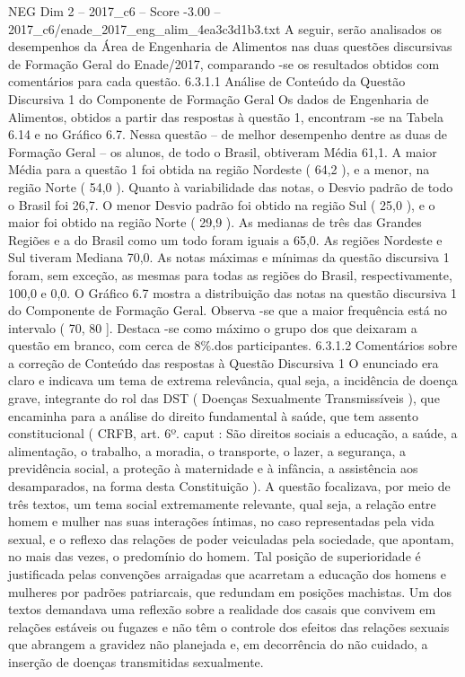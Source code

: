 \begin{textsample}{NEG Dim 2 – 2017\_c6 – Score -3.00 – 2017\_c6/enade\_2017\_eng\_alim\_4ea3c3d1b3.txt}
A seguir, serão analisados os desempenhos da Área de Engenharia de Alimentos nas duas questões discursivas de Formação Geral do Enade/2017, comparando -se os resultados obtidos com comentários para cada questão. 6.3.1.1 Análise de Conteúdo da Questão Discursiva 1 do Componente de Formação Geral Os dados de Engenharia de Alimentos, obtidos a partir das respostas à questão 1, encontram -se na Tabela 6.14 e no Gráfico 6.7.
Nessa questão – de melhor desempenho dentre as duas de Formação Geral – os alunos, de todo o Brasil, obtiveram Média 61,1.
A maior Média para a questão 1 foi obtida na região Nordeste ( 64,2 ), e a menor, na região Norte ( 54,0 ).
Quanto à variabilidade das notas, o Desvio padrão de todo o Brasil foi 26,7.
O menor Desvio padrão foi obtido na região Sul ( 25,0 ), e o maior foi obtido na região Norte ( 29,9 ).
As medianas de três das Grandes Regiões e a do Brasil como um todo foram iguais a 65,0.
As regiões Nordeste e Sul tiveram Mediana 70,0.
As notas máximas e mínimas da questão discursiva 1 foram, sem exceção, as mesmas para todas as regiões do Brasil, respectivamente, 100,0 e 0,0.
O Gráfico 6.7 mostra a distribuição das notas na questão discursiva 1 do Componente de Formação Geral.
Observa -se que a maior frequência está no intervalo ( 70, 80 ].
Destaca -se como máximo o grupo dos que deixaram a questão em branco, com cerca de 8\%.dos participantes. 6.3.1.2 Comentários sobre a correção de Conteúdo das respostas à Questão Discursiva 1 O enunciado era claro e indicava um tema de extrema relevância, qual seja, a incidência de doença grave, integrante do rol das DST ( Doenças Sexualmente Transmissíveis ), que encaminha para a análise do direito fundamental à saúde, que tem assento constitucional ( CRFB, art. 6º. caput : São direitos sociais a educação, a saúde, a alimentação, o trabalho, a moradia, o transporte, o lazer, a segurança, a previdência social, a proteção à maternidade e à infância, a assistência aos desamparados, na forma desta Constituição ).
A questão focalizava, por meio de três textos, um tema social extremamente relevante, qual seja, a relação entre homem e mulher nas suas interações íntimas, no caso representadas pela vida sexual, e o reflexo das relações de poder veiculadas pela sociedade, que apontam, no mais das vezes, o predomínio do homem.
Tal posição de superioridade é justificada pelas convenções arraigadas que acarretam a educação dos homens e mulheres por padrões patriarcais, que redundam em posições machistas.
Um dos textos demandava uma reflexão sobre a realidade dos casais que convivem em relações estáveis ou fugazes e não têm o controle dos efeitos das relações sexuais que abrangem a gravidez não planejada e, em decorrência do não cuidado, a inserção de doenças transmitidas sexualmente.

\end{textsample}
